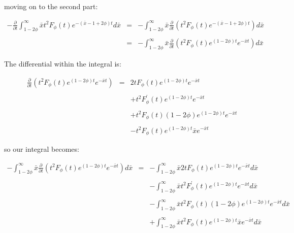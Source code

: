 moving on to the second part: \bigskip

\begin{eqnarray*}
	-\frac{\partial}{\partial t} \int_{1 - 2 \phi}^{\infty} \bar{x} t^2 F_{\phi}(t) e^{-(\bar{x} - 1 + 2 \phi)t} d\bar{x} & = & 
			-\int_{1 - 2 \phi}^{\infty} \bar{x} \frac{\partial}{\partial t} \left( t^2 F_{\phi}(t) e^{-(\bar{x} - 1 + 2 \phi)t} \right) d\bar{x} \\\\
																														  & = & 
			-\int_{1 - 2 \phi}^{\infty} \bar{x} \frac{\partial}{\partial t} \left( t^2 F_{\phi}(t) e^{(1 - 2 \phi)t} e^{-\bar{x} t} \right) d\bar{x} 
\end{eqnarray*}\medskip

The differential within the integral is: \bigskip

\begin{eqnarray*}
	\frac{\partial}{\partial t} \left( t^2 F_{\phi}(t) e^{(1 - 2 \phi)t} e^{-\bar{x} t} \right) & = & 2 t F_{\phi}(t) e^{(1 - 2 \phi)t} e^{-\bar{x} t} \\\\
																								&   & + t^2 F_{\phi}^{\prime}(t) e^{(1 - 2 \phi)t} e^{-\bar{x} t} \\\\
																								&   & + t^2 F_{\phi}(t) (1 - 2 \phi) e^{(1 - 2 \phi)t} e^{-\bar{x} t} \\\\
																								&   & - t^2 F_{\phi}(t) e^{(1 - 2 \phi)t} \bar{x} e^{-\bar{x} t} 
\end{eqnarray*}\medskip

so our integral becomes: \bigskip

\begin{eqnarray*}
	-\int_{1 - 2 \phi}^{\infty} \bar{x} \frac{\partial}{\partial t} \left( t^2 F_{\phi}(t) e^{(1 - 2 \phi)t} e^{-\bar{x} t} \right) d\bar{x} & = & 
			-\int_{1 - 2 \phi}^{\infty} \bar{x} 2 t F_{\phi}(t) e^{(1 - 2 \phi)t} e^{-\bar{x} t} d\bar{x} \\\\
																																			 &   & 
			- \int_{1 - 2 \phi}^{\infty} \bar{x} t^2 F_{\phi}^{\prime}(t) e^{(1 - 2 \phi)t} e^{-\bar{x} t} d\bar{x} \\\\
																																			 &   & 
			- \int_{1 - 2 \phi}^{\infty} \bar{x} t^2 F_{\phi}(t) (1 - 2 \phi) e^{(1 - 2 \phi)t} e^{-\bar{x} t} d\bar{x} \\\\
																																			 &   & 
			+ \int_{1 - 2 \phi}^{\infty} \bar{x} t^2 F_{\phi}(t) e^{(1 - 2 \phi)t} \bar{x} e^{-\bar{x} t} d\bar{x}
\end{eqnarray*}\medskip


